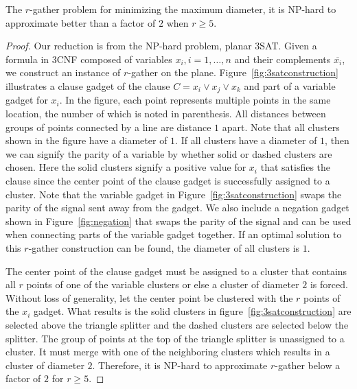 \begin{theorem} \label{thm:hardness1}
The $r$-gather problem for minimizing the maximum diameter, it is NP-hard to approximate better than a factor of $2$ when $r\geq5$. 
\end{theorem}
\begin{proof}
Our reduction is from the NP-hard problem, planar 3SAT.  Given a formula in 3CNF composed of variables $x_i, i = 1,\dots,n$ and their complements $\overline{x_i}$, we construct an instance of $r$-gather on the plane.  Figure~\ref{fig:3satconstruction} illustrates a clause gadget of the clause $C = x_i \vee x_j \vee x_k$ and part of a variable gadget for $x_i$.  In the figure, each point represents multiple points in the same location, the number of which is noted in parenthesis.  All distances between groups of points connected by a line are distance $1$ apart.  Note that all clusters shown in the figure have a diameter of $1$.  If all clusters have a diameter of $1$, then we can signify the parity of a variable by whether solid or dashed clusters are chosen.  Here the solid clusters signify a positive value for $x_i$ that satisfies the clause since the center point of the clause gadget is successfully assigned to a cluster.  Note that the variable gadget in Figure~\ref{fig:3satconstruction} swaps the parity of the signal sent away from the gadget.  We also include a negation gadget shown in Figure~\ref{fig:negation} that swaps the parity of the signal and can be used when connecting parts of the variable gadget together.  If an optimal solution to this $r$-gather construction can be found, the diameter of all clusters is $1$.


The center point of the clause gadget must be assigned to a cluster that contains all $r$ points of one of the variable clusters or else a cluster of diameter $2$ is forced.  Without loss of generality, let the center point be clustered with the $r$ points of the $x_i$ gadget.  What results is the solid clusters in figure~\ref{fig:3satconstruction} are selected above the triangle splitter and the dashed clusters are selected below the splitter.  The group of points at the top of the triangle splitter is unassigned to a cluster.  It must merge with one of the neighboring clusters which results in a cluster of diameter $2$.  Therefore, it is NP-hard to approximate $r$-gather below a factor of $2$ for $r\geq5$.
\end{proof}

